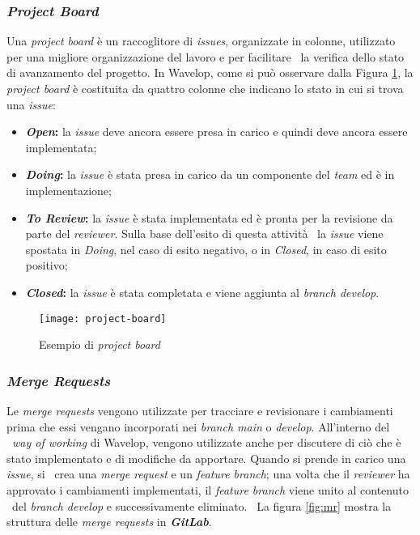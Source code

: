 \newpage
\subsubsection{\emph{Project Board}}
Una \emph{project board} è un raccoglitore di \emph{issues}, organizzate in colonne, utilizzato per una migliore organizzazione del lavoro e per facilitare \
la verifica dello stato di avanzamento del progetto. In Wavelop, come si può osservare dalla Figura \ref{fig:board}, la \emph{project board} è costituita da quattro colonne che indicano lo stato in cui si trova una \emph{issue}:

\begin{itemize}
  \item \textbf{\emph{Open}:} la \emph{issue} deve ancora essere presa in carico e quindi deve ancora essere implementata;
  \item \textbf{\emph{Doing}:} la \emph{issue} è stata presa in carico da un componente del \emph{team} ed è in implementazione;
  \item \textbf{\emph{To Review}:} la \emph{issue} è stata implementata ed è pronta per la revisione da parte del \emph{reviewer}. Sulla base dell'esito di questa attività \
  la \emph{issue} viene spostata in \emph{Doing}, nel caso di esito negativo, o in \emph{Closed}, in caso di esito positivo;
  \item \textbf{\emph{Closed}:} la \emph{issue} è stata completata e viene aggiunta al \emph{branch develop}.
\end{itemize}
\begin{figure}[!ht]
  \begin{center}
    \texttt{[image: project-board]}
    \caption{Esempio di \emph{project board}}
    \label{fig:board}
  \end{center}
\end{figure}

\newpage
\subsubsection{\emph{Merge Requests}}
Le \emph{merge requests} vengono utilizzate per tracciare e revisionare i cambiamenti prima che essi vengano incorporati nei \emph{branch main} o \emph{develop}. All'interno del \
\emph{way of working} di Wavelop, vengono utilizzate anche per discutere di ciò che è stato implementato e di modifiche da apportare. Quando si prende in carico una \emph{issue}, si \
crea una \emph{merge request} e un \emph{feature branch}; una volta che il \emph{reviewer} ha approvato i cambiamenti implementati, il \emph{feature branch} viene unito al contenuto \
del \emph{branch develop} e successivamente eliminato. \
La figura \ref{fig:mr} mostra la struttura delle \emph{merge requests} in \textbf{\emph{GitLab}}.

